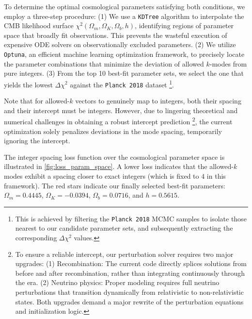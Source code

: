 To determine the optimal cosmological parameters satisfying both conditions, we employ a three-step procedure: 
(1) We use a \texttt{KDTree} algorithm to interpolate the CMB likelihood surface $\chi^2(\Omega_m,\Omega_K,\Omega_b,h)$, identifying regions of parameter space that broadly fit observations. This prevents the wasteful execution of expensive ODE solvers on observationally excluded parameters. 
(2) We utilize \texttt{Optuna}, an efficient machine learning optimization framework, to precisely locate the parameter combinations that minimize the deviation of allowed $k$-modes from pure integers. 
(3) From the top 10 best-fit parameter sets, we select the one that yields the lowest $\Delta\chi^2$ against the \texttt{Planck 2018} dataset \footnote{This is achieved by filtering the \texttt{Planck 2018} MCMC samples to isolate those nearest to our candidate parameter sets, and subsequently extracting the corresponding $\Delta\chi^2$ values.}.

{\footnotesize Note that for allowed-$k$ vectors to genuinely map to integers, both their spacing and their intercept must be integers. However, due to lingering theoretical and numerical challenges in obtaining a robust intercept prediction \footnote{To ensure a reliable intercept, our perturbation solver requires two major upgrades: (1) Recombination: The current code directly splices solutions from before and after recombination, rather than integrating continuously through the era. (2) Neutrino physics: Proper modeling requires full neutrino perturbations that transition dynamically from relativistic to non-relativistic states. Both upgrades demand a major rewrite of the perturbation equations and initialization logic.}, the current optimization solely penalizes deviations in the mode spacing, temporarily ignoring the intercept.}

The integer spacing loss function over the cosmological parameter space is illustrated in \cref{fig:loss_param_space}. A lower loss indicates that the allowed-$k$ modes exhibit a spacing closer to exact integers (which is fixed to $4$ in this framework). The red stars indicate our finally selected best-fit parameters: $\Omega_m=0.4445$, $\Omega_K=-0.0394$, $\Omega_b=0.0716$, and $h=0.5615$.

